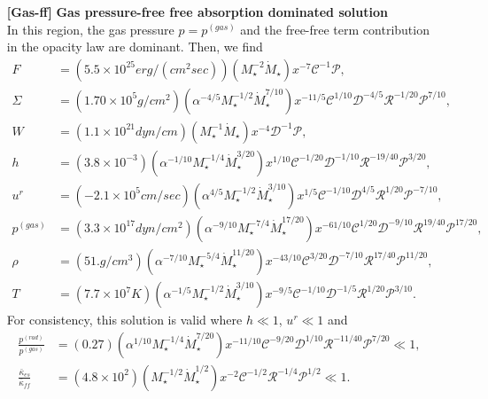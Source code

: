 \documentclass[a4paper,fleqn,usenatbib]{mnrasMOD}
\numberwithin{equation}{section}
\begin{document}
\begin{enumerate}
\item[{\bf [Gas-ff]}]{\bf Gas pressure-free free absorption dominated solution}\\
In this region, the gas pressure $p=p^{(gas)}$ and the free-free term contribution in the opacity law are dominant. Then, we find
\begin{subequations} \label{sol gasff}
\begin{align}
F 				&= \left(5.5 \times 10^{25} erg/(cm^2 sec)\right) \left(M_{\star}^{-2} \dot{M}_{\star}\right) x^{-7} \mathcal{C}^{-1} \mathcal{P},\\
\Sigma   &=\left(1.70 \times 10^5 g/cm^2 \right) \left(\alpha^{-4/5} M_{\star}^{-1/2} \dot{M}_{\star}^{7/10}\right) x^{-11/5} \mathcal{C}^{1/10} \mathcal{D}^{-4/5} \mathcal{R}^{-1/20} \mathcal{P}^{7/10},\\
W				&=\left(1.1 \times 10^{21} dyn/cm\right) \left(M_{\star}^{-1} \dot{M}_{\star}\right) x^{-4} \mathcal{D}^{-1} \mathcal{P},\\
h				&=\left(3.8 \times 10^{-3}\right) \left(\alpha^{-1/10} M_{\star}^{-1/4} \dot{M}_{\star}^{3/20}\right) x^{1/10} \mathcal{C}^{-1/20} \mathcal{D}^{-1/10} \mathcal{R}^{-19/40} \mathcal{P}^{3/20},\label{hB3}\\
u^{r}		&=\left(-2.1 \times 10^5  cm/sec \right) \left(\alpha^{4/5} M_{\star}^{-1/2} \dot{M}_{\star}^{3/10}\right) x^{1/5} \mathcal{C}^{-1/10} \mathcal{D}^{4/5} \mathcal{R}^{1/20} \mathcal{P}^{-7/10},\\
p^{(gas)}&=\left(3.3 \times 10^{17} dyn/cm^2\right) \left(\alpha^{-9/10} M_{\star}^{-7/4} \dot{M}_{\star}^{17/20}\right) x^{-61/10} \mathcal{C}^{1/20} \mathcal{D}^{-9/10} \mathcal{R}^{19/40} \mathcal{P}^{17/20},\\
\rho			&=\left(51. g/cm^3\right) \left(\alpha^{-7/10} M_{\star}^{-5/4} \dot{M}_{\star}^{11/20}\right) x^{-43/10} \mathcal{C}^{3/20} \mathcal{D}^{-7/10} \mathcal{R}^{17/40} \mathcal{P}^{11/20},\\
T				&=\left(7.7 \times 10^7 K\right) \left(\alpha^{-1/5} M_{\star}^{-1/2} \dot{M}_{\star}^{3/10}\right) x^{-9/5} \mathcal{C}^{-1/10} \mathcal{D}^{-1/5} \mathcal{R}^{1/20} \mathcal{P}^{3/10}.
\end{align}
\end{subequations}
For consistency, this solution is valid where $h\ll1$, $u^r \ll1$ and 
\begin{subequations} \label{consistency gasff}
\begin{align}
\frac{p^{(rad)}}{p^{(gas)}}			&=\left(0.27\right) \left(\alpha^{1/10} M_{\star}^{-1/4} \dot{M}_{\star}^{7/20}\right) x^{-11/10} \mathcal{C}^{-9/20} \mathcal{D}^{1/10} \mathcal{R}^{-11/40} \mathcal{P}^{7/20} \ll 1, \label{consistency gasff1}\\
\frac{\bar{\kappa}_{es}}{\bar{\kappa}_{ff}}			&=\left( 4.8 \times 10^2  \right) \left(M_{\star}^{-1/2} \dot{M}_{\star}^{1/2} \right) x^{-2} \mathcal{C}^{-1/2} \mathcal{R}^{-1/4} \mathcal{P}^{1/2} \ll1.
\end{align}
\end{subequations}

\end{enumerate}
\end{document}
